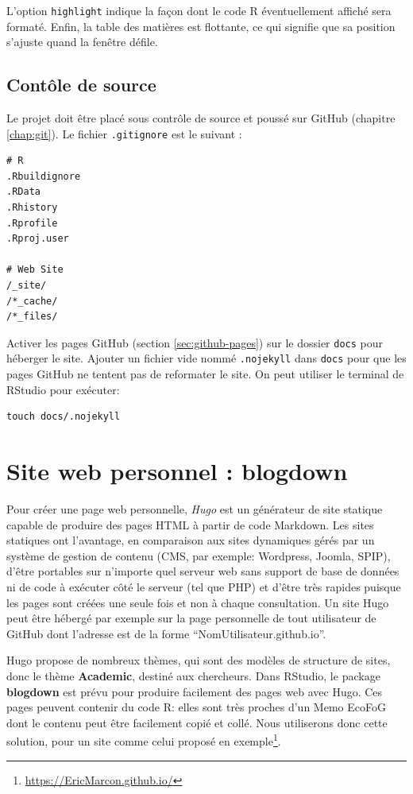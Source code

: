 \documentclass[
  11pt,
  french,
  a4paper,
  extrafontsizes,onecolumn,openright
  ]{memoir}
\begin{document}
L'option \texttt{highlight} indique la façon dont le code R éventuellement affiché sera formaté.
Enfin, la table des matières est flottante, ce qui signifie que sa position s'ajuste quand la fenêtre défile.

\hypertarget{contuxf4le-de-source}{%
\subsection{Contôle de source}\label{contuxf4le-de-source}}

Le projet doit être placé sous contrôle de source et poussé sur GitHub (chapitre \ref{chap:git}).
Le fichier \texttt{.gitignore} est le suivant :

\begin{verbatim}
# R
.Rbuildignore
.RData
.Rhistory
.Rprofile
.Rproj.user

# Web Site
/_site/
/*_cache/
/*_files/
\end{verbatim}

Activer les pages GitHub (section \ref{sec:github-pages}) sur le dossier \texttt{docs} pour héberger le site.
Ajouter un fichier vide nommé \texttt{.nojekyll} dans \texttt{docs} pour que les pages GitHub ne tentent pas de reformater le site.
On peut utiliser le terminal de RStudio pour exécuter:

\begin{verbatim}
touch docs/.nojekyll
\end{verbatim}

\hypertarget{sec:blogdown}{%
\section{Site web personnel : blogdown}\label{sec:blogdown}}

Pour créer une page web personnelle, \emph{Hugo} est un générateur de site statique capable de produire des pages HTML à partir de code Markdown.
Les sites statiques ont l'avantage, en comparaison aux sites dynamiques gérés par un système de gestion de contenu (CMS, par exemple: Wordpress, Joomla, SPIP), d'être portables sur n'importe quel serveur web sans support de base de données ni de code à exécuter côté le serveur (tel que PHP) et d'être très rapides puisque les pages sont créées une seule fois et non à chaque consultation.
Un site Hugo peut être hébergé par exemple sur la page personnelle de tout utilisateur de GitHub dont l'adresse est de la forme ``NomUtilisateur.github.io''.

Hugo propose de nombreux thèmes, qui sont des modèles de structure de sites, donc le thème \textbf{Academic}, destiné aux chercheurs.
Dans RStudio, le package \textbf{blogdown} est prévu pour produire facilement des pages web avec Hugo.
Ces pages peuvent contenir du code R: elles sont très proches d'un Memo EcoFoG dont le contenu peut être facilement copié et collé.
Nous utiliserons donc cette solution, pour un site comme celui proposé en exemple\footnote{\url{https://EricMarcon.github.io/}}.
\end{document}
